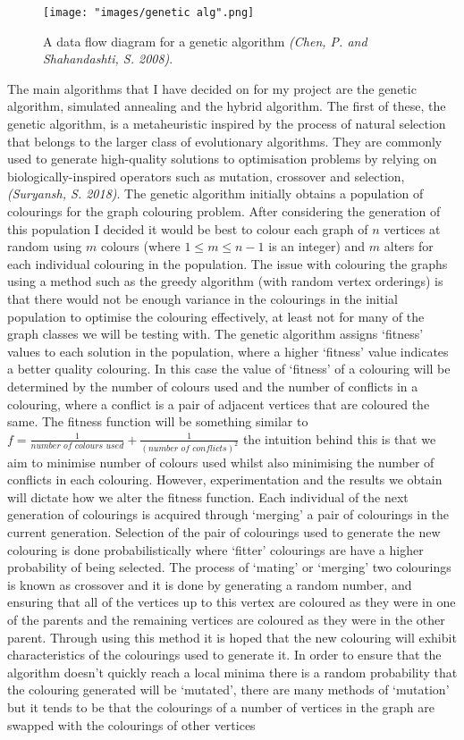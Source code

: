\documentclass[12pt,a4paper]{article}
\begin{document}
\begin{wrapfigure}{h}{0.4\textwidth}
\texttt{[image: "images/genetic alg".png]}
\caption{A data flow diagram for a genetic algorithm \textit{(Chen, P. and Shahandashti, S. 2008)}.}
\label{fig:gen}
\end{wrapfigure}
\par The main algorithms that I have decided on for my project are the genetic algorithm, simulated annealing and the hybrid algorithm. The first of these, the genetic algorithm, is a metaheuristic inspired by the process of natural selection that belongs to the larger class of evolutionary algorithms. They are commonly used to generate high-quality solutions to optimisation problems by relying on biologically-inspired operators such as mutation, crossover and selection, \textit{(Suryansh, S. 2018)}. The genetic algorithm initially obtains a population of colourings for the graph colouring problem. After considering the generation of this population I decided it would be best to colour each graph of $n$ vertices at random using $m$ colours (where $1 \leq m \leq n-1$ is an integer) and $m$ alters for each individual colouring in the population. The issue with colouring the graphs using a method such as the greedy algorithm (with random vertex orderings) is that there would not be enough variance in the colourings in the initial population to optimise the colouring effectively, at least not for many of the graph classes we will be testing with. The genetic algorithm assigns `fitness' values to each solution in the population, where a higher `fitness' value indicates a better quality colouring.  In this case the value of `fitness' of a colouring will be determined by the number of colours used and the number of conflicts in a colouring, where a conflict is a pair of adjacent vertices that are coloured the same. The fitness function will be something similar to $f = \frac{1}{\textit{number of colours used}} + \frac{1}{(\textit{number of conflicts})^2}$ the intuition behind this is that we aim to minimise number of colours used whilst also minimising the number of conflicts in each colouring. However, experimentation and the results we obtain will dictate how we alter the fitness function. Each individual of the next generation of colourings is acquired through `merging' a pair of colourings in the current generation. Selection of the pair of colourings used to generate the new colouring is done probabilistically where `fitter' colourings are have a higher probability of being selected. The process of `mating' or `merging' two colourings is known as crossover and it is done by generating a random number, and ensuring that all of the vertices up to this vertex are coloured as they were in one of the parents and the remaining vertices are coloured as they were in the other parent. Through using this method it is hoped that the new colouring will exhibit characteristics of the colourings used to generate it. In order to ensure that the algorithm doesn't quickly reach a local minima there is a random probability that the colouring generated will be `mutated', there are many methods of `mutation' but it tends to be that the colourings of a number of vertices in the graph are swapped with the colourings of other vertices 
\end{document}
